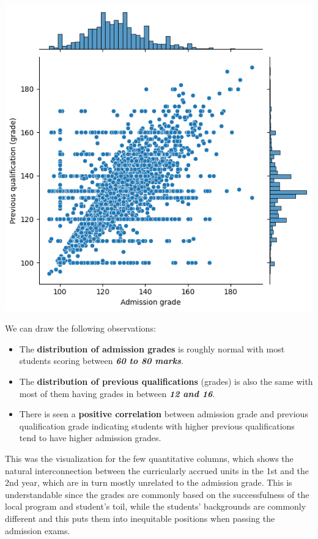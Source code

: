 \documentclass[
  letterpaper,
  DIV=11,
  numbers=noendperiod]{scrartcl}
\begin{document}
\includegraphics{report_AzadhdhinNedalYunisAlFraijat_files/figure-pdf/cell-21-output-1.png}

We can draw the following observations:

\begin{itemize}
\item
  The \textbf{distribution of admission grades} is roughly normal with
  most students scoring between \textbf{\emph{60 to 80 marks}}.
\item
  The \textbf{distribution of previous qualifications} (grades) is also
  the same with most of them having grades in between \textbf{\emph{12
  and 16}}.
\item
  There is seen a \textbf{positive correlation} between admission grade
  and previous qualification grade indicating students with higher
  previous qualifications tend to have higher admission grades.
\end{itemize}

This was the visualization for the few quantitative columns, which shows
the natural interconnection between the curricularly accrued units in
the 1st and the 2nd year, which are in turn mostly unrelated to the
admission grade. This is understandable since the grades are commonly
based on the successfulness of the local program and student's toil,
while the students' backgrounds are commonly different and this puts
them into inequitable positions when passing the admission exams.
\end{document}
